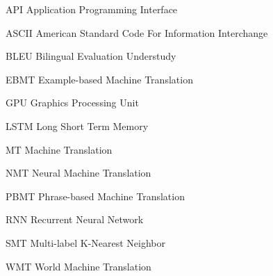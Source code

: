 \newcommand{\abbrlabel}[1]{\makebox[3cm][l]{\textbf{#1}}}
\newenvironment{abbreviations}{\begin{list}{}{\renewcommand{\makelabel}{\abbrlabel}}}{\end{list}}
\begin{abbreviations}
	\item[API] Application Programming Interface
	\item[ASCII] American Standard Code For Information Interchange
	\item[BLEU] Bilingual Evaluation Understudy
	\item[EBMT] Example-based Machine Translation
	\item[GPU] Graphics Processing Unit
	\item[LSTM] Long Short Term Memory
	\item[MT] Machine Translation
	\item[NMT] Neural Machine Translation
	\item[PBMT] Phrase-based Machine Translation
	\item[RNN] Recurrent Neural Network
	\item[SMT] Multi-label K-Nearest Neighbor
	\item[WMT] World Machine Translation
\end{abbreviations}


